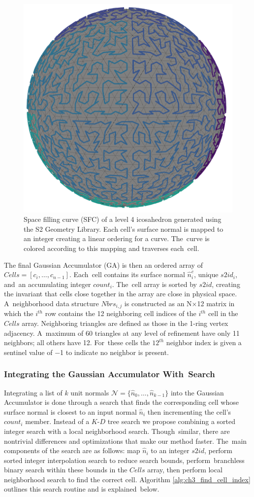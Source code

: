 \begin{figure}[H]
    \centering
    \includegraphics[width=.20\linewidth]{chapter_3_polylidar3d/imgs/fastga_ico_hilbert_v3.png}
    \caption{Space filling curve (SFC) of a level 4 icosahedron generated using the S2 Geometry Library. Each cell's surface normal is mapped to an integer creating a linear ordering for a curve. The~curve is colored according to this mapping and traverses each~cell.   }
    \label{fig:ch3_fastga_hilbert}
\end{figure}

The final Gaussian Accumulator (GA) is then an ordered array of $Cells = [ c_i, \ldots, c_{n-1}] $. Each~cell contains its surface normal $\hat{n}^{c}_{i}$, unique $s2id_i$, and~an accumulating integer $count_i$. The~cell array is sorted by $s2id$, creating the invariant that cells close together in the array are close in physical space. A~neighborhood data structure $Nbrs_{i,j}$ is constructed as an N$\times$12 matrix in which the $i^{th}$ row contains the 12 neighboring cell indices of the $i^{th}$ cell in the $Cells$ array. Neighboring triangles are defined as those in the 1-ring vertex adjacency. A~maximum of 60 triangles at any level of refinement have only 11 neighbors; all others have 12. For~these cells the $12^{th}$ neighbor index is given a sentinel value of $-$1 to indicate no neighbor is present. 

\subsubsection{Integrating the Gaussian Accumulator With~Search}\label{sec:ch3_methods_fastga_search}
Integrating a list of $k$ unit normals $\mathcal{N} = \{\hat{n}_0, \ldots, \hat{n}_{k-1} \}$ into the Gaussian Accumulator is done through a search that finds the corresponding cell whose surface normal is closest to an input normal $\hat{n}_i$ then incrementing the cell's $count_i$ member.
Instead of a $K$-$D$ tree search we propose combining a sorted integer search with a local neighborhood search. Though~similar, there are nontrivial differences and optimizations that make our method faster.  The~main components of the search are as follows: map $\hat{n}_i$ to an integer $s2id$, perform sorted integer interpolation search to reduce search bounds, perform~branchless binary search within these bounds in the $Cells$ array, then  perform local neighborhood search to find the correct cell. Algorithm \ref{alg:ch3_find_cell_index} outlines this search routine and is explained~below.

